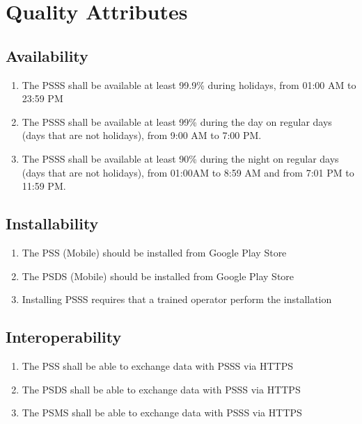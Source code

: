 \section{Quality Attributes}
\subsection{Availability}
\begin{enumerate}[label=AVL-\arabic*]
    \item The PSSS shall be available at least 99.9\% during holidays, 
    from 01:00 AM to 23:59 PM
    \item The PSSS shall be available at least 99\% during the day on regular 
    days (days that are not holidays), from 9:00 AM to 7:00 PM.
    \item The PSSS shall be available at least 90\% during 
    the night on regular days (days that are not holidays), from 
    01:00AM to 8:59 AM and from 7:01 PM to 11:59 PM.
\end{enumerate}

\subsection{Installability}
\begin{enumerate}[label=INS-\arabic*]
    \item The PSS (Mobile) should be installed from Google Play Store
    \item The PSDS (Mobile) should be installed from Google Play Store
    \item Installing PSSS requires that a trained operator perform 
    the installation
\end{enumerate}

\subsection{Interoperability}
\begin{enumerate}[label=IOP-\arabic*]
    \item The PSS shall be able to exchange data with PSSS via HTTPS
    \item The PSDS shall be able to exchange data with PSSS via HTTPS
    \item The PSMS shall be able to exchange data with PSSS via HTTPS
\end{enumerate}
\pagebreak
